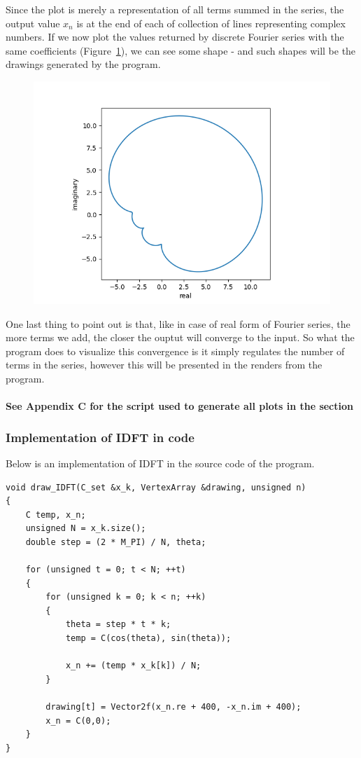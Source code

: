 \documentclass[titlepage]{article}
\begin{document}
    Since the plot is merely a representation of all terms summed in the series,
    the output value $x_n$ is at the end of each of collection of lines representing
    complex numbers. If we now plot the values returned by discrete Fourier 
    series with the same coefficients (Figure~\ref{fig:dfs_explainer_4}), we can 
    see some shape - and such shapes will be the drawings generated by the 
    program.
    \begin{figure}[H]
        \caption{}
        \centering
        \includegraphics[width=0.5\linewidth]{dfs_explainer_4}
        \label{fig:dfs_explainer_4}
    \end{figure}
    One last thing to point out is that, like in case of real form of Fourier
    series, the more terms we add, the closer the ouptut will converge to the 
    input. So what the program does to visualize this convergence is it simply
    regulates the number of terms in the series, however this will be presented
    in the renders from the program.
    \paragraph{See Appendix C for the script used to generate all plots in the 
    section}

\subsubsection{Implementation of IDFT in code}

    Below is an implementation of IDFT in the source code of the program.
    \begin{verbatim}
void draw_IDFT(C_set &x_k, VertexArray &drawing, unsigned n)
{
    C temp, x_n;
    unsigned N = x_k.size();
    double step = (2 * M_PI) / N, theta;

    for (unsigned t = 0; t < N; ++t)
    {
        for (unsigned k = 0; k < n; ++k)
        {
            theta = step * t * k;     
            temp = C(cos(theta), sin(theta));

            x_n += (temp * x_k[k]) / N;
        }

        drawing[t] = Vector2f(x_n.re + 400, -x_n.im + 400);
        x_n = C(0,0);
    }
}
    \end{verbatim}
\end{document}
